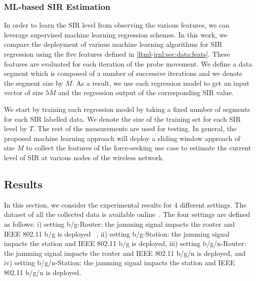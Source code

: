 \subsubsection{ML-based SIR Estimation}\label{ftml-jrnl:sec:data:ML}
In order to learn the SIR level from observing the various features, we can leverage supervised machine learning regression schemes. 
In this work, we compare the deployment of various machine learning algorithms for SIR regression using the five features defined in \ref{ftml-jrnl:sec:data:feats}. These features are evaluated for each iteration of the probe movement. We define a data segment which is composed of a number of successive iterations and we denote the segment size by $M$. As a result, we use each regression model to get an input vector of size $5M$ and the regression output of the corresponding SIR value. 

We start by training each regression model by taking a fixed number of segments for each SIR labelled data. We denote the size of the training set for each SIR level by $T$. The rest of the measurements are used for testing. In general, the proposed machine learning approach will deploy a sliding window approach of size $M$ to collect the features of the force-seeking use case to estimate the current level of SIR at various nodes of the wireless network. 

\subsection{Results} \label{ftml-jrnl:sec:results}  
In this section, we consider the experimental results for 4 different settings. The dataset of all the collected data is available online~\cite{https://doi.org/10.18434/m32077}. The four settings are defined as follows: i) setting b/g-Router: the jamming signal impacts the router and IEEE 802.11 b/g is deployed ~\cite{IEEE802.11ac}, ii) setting b/g-Station: the jamming signal impacts the station and IEEE 802.11 b/g is deployed, iii) setting b/g/n-Router: the jamming signal impacts the router and IEEE 802.11 b/g/n is deployed, and iv) setting b/g/n-Station: the jamming signal impacts the station and IEEE 802.11 b/g/n is deployed.  


